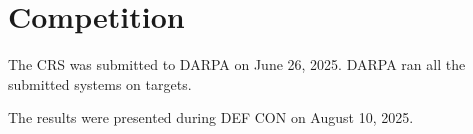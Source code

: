 \section{Competition}
\label{competition}

The \artiphishell CRS was submitted to DARPA on June 26, 2025.
DARPA ran all the submitted systems on \numberoftargets targets.

The results were presented during DEF CON on August 10, 2025.
